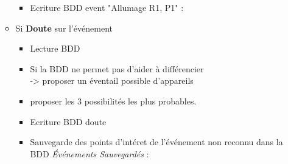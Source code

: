\documentclass[10pt,a4paper]{article}
\begin{document}
\begin{enumerate}
\begin{itemize}
		\begin{itemize}
			\item Ecriture BDD event "Allumage R1, P1" : 
		\end{itemize} 
		\item Si \textbf{Doute} sur l'événement
		\begin{itemize}
			\item Lecture BDD 
			\item Si la BDD ne permet pas d'aider à différencier \\
			-> proposer un éventail possible d'appareils
			\item proposer les 3 possibilités les plus probables.
			\item Ecriture BDD doute 
			\item Sauvegarde des points d'intéret de l'événement non reconnu dans la BDD  \textit{Événements Sauvegardés} : 
		\end{itemize} 
	\end{itemize}
\end{enumerate}

\newpage
\end{document}
